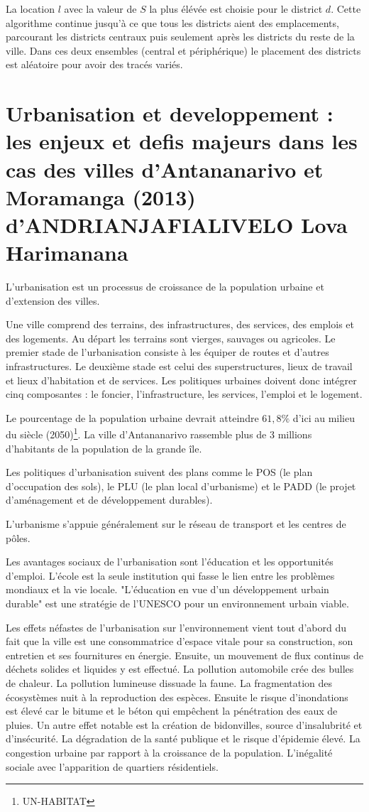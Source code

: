 \documentclass[11pt]{article}
\begin{document}
La location $l$ avec la valeur de $S$ la plus élévée est choisie pour le district $d$. Cette algorithme continue jusqu'à ce que tous les districts aient des emplacements, parcourant les districts centraux puis seulement après les districts du reste de la ville. Dans ces deux ensembles (central et périphérique) le placement des districts est aléatoire pour avoir des tracés variés.

\section{Urbanisation et developpement : les enjeux et defis majeurs dans les cas des villes d'Antananarivo et Moramanga (2013) d'ANDRIANJAFIALIVELO Lova Harimanana}

L'urbanisation est un processus de croissance de la population urbaine et d'extension des villes.

Une ville comprend des terrains, des infrastructures, des services, des emplois et des logements. 
Au départ les terrains sont vierges, sauvages ou agricoles. Le premier stade de l'urbanisation consiste à les équiper de routes et d'autres infrastructures. Le deuxième stade est celui des superstructures, lieux de travail et lieux d'habitation et de services.
Les politiques urbaines doivent donc intégrer cinq composantes : le foncier, l'infrastructure, les services, l'emploi et le logement.

Le pourcentage de la population urbaine devrait atteindre $61,8\%$ d'ici au milieu du siècle (2050)\footnote{UN-HABITAT}. La ville d'Antananarivo rassemble plus de 3 millions d'habitants de la population de la grande île.

Les politiques d'urbanisation suivent des plans comme le POS (le plan d'occupation des sols), le PLU (le plan local d'urbanisme) et le PADD (le projet d'aménagement et de développement durables).

L'urbanisme s'appuie généralement sur le réseau de transport et les centres de pôles.

Les avantages sociaux de l'urbanisation sont l'éducation et les opportunités d'emploi.
L'école est la seule institution qui fasse le lien entre les problèmes mondiaux et la vie locale. "L'éducation en vue d'un développement urbain durable" est une stratégie de l'UNESCO pour un environnement urbain viable.

Les effets néfastes de l'urbanisation sur l'environnement vient tout d'abord du fait que la ville est une consommatrice d'espace vitale pour sa construction, son entretien et ses fournitures en énergie. Ensuite, un mouvement de flux continus de déchets solides et liquides y est effectué. La pollution automobile crée des bulles de chaleur. La pollution lumineuse dissuade la faune. La fragmentation des écosystèmes nuit à la reproduction des espèces. Ensuite le risque d'inondations est élevé car le bitume et le béton  qui empêchent la pénétration des eaux de pluies. 
Un autre effet notable est la création de bidonvilles, source d'insalubrité et d'insécurité. La dégradation de la santé publique et le risque d'épidemie élevé.
La congestion urbaine par rapport à la croissance de la population.
L'inégalité sociale avec l'apparition de quartiers résidentiels.
\end{document}
